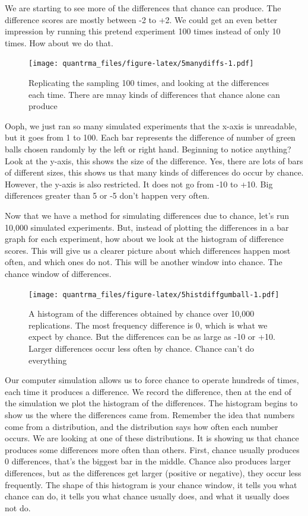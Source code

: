 \documentclass[
]{book}
\begin{document}
We are starting to see more of the differences that chance can produce. The difference scores are mostly between -2 to +2. We could get an even better impression by running this pretend experiment 100 times instead of only 10 times. How about we do that.

\begin{figure}
\centering
\texttt{[image: quantrma\_files/figure-latex/5manydiffs-1.pdf]}
\caption{\label{fig:5manydiffs}Replicating the sampling 100 times, and looking at the differences each time. There are mnay kinds of differences that chance alone can produce}
\end{figure}

Ooph, we just ran so many simulated experiments that the x-axis is unreadable, but it goes from 1 to 100. Each bar represents the difference of number of green balls chosen randomly by the left or right hand. Beginning to notice anything? Look at the y-axis, this shows the size of the difference. Yes, there are lots of bars of different sizes, this shows us that many kinds of differences do occur by chance. However, the y-axis is also restricted. It does not go from -10 to +10. Big differences greater than 5 or -5 don't happen very often.

Now that we have a method for simulating differences due to chance, let's run 10,000 simulated experiments. But, instead of plotting the differences in a bar graph for each experiment, how about we look at the histogram of difference scores. This will give us a clearer picture about which differences happen most often, and which ones do not. This will be another window into chance. The chance window of differences.

\begin{figure}
\centering
\texttt{[image: quantrma\_files/figure-latex/5histdiffgumball-1.pdf]}
\caption{\label{fig:5histdiffgumball}A histogram of the differences obtained by chance over 10,000 replications. The most frequency difference is 0, which is what we expect by chance. But the differences can be as large as -10 or +10. Larger differences occur less often by chance. Chance can't do everything}
\end{figure}

Our computer simulation allows us to force chance to operate hundreds of times, each time it produces a difference. We record the difference, then at the end of the simulation we plot the histogram of the differences. The histogram begins to show us the where the differences came from. Remember the idea that numbers come from a distribution, and the distribution says how often each number occurs. We are looking at one of these distributions. It is showing us that chance produces some differences more often than others. First, chance usually produces 0 differences, that's the biggest bar in the middle. Chance also produces larger differences, but as the differences get larger (positive or negative), they occur less frequently. The shape of this histogram is your chance window, it tells you what chance can do, it tells you what chance usually does, and what it usually does not do.
\end{document}
